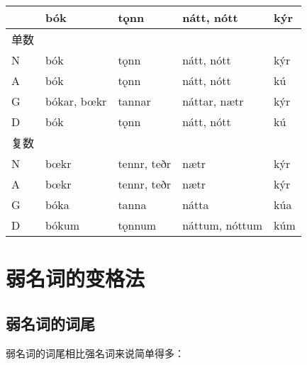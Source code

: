 \begin{longtable}{lllll}
  \toprule
       & \textbf{bók} & \textbf{tǫnn} & \textbf{nátt, nótt} & \textbf{kýr} \\
  \midrule
  \endhead
  \bottomrule
  \endfoot
  单数 &              &               &                     &              \\
  N    & bók          & tǫnn          & nátt, nótt          & kýr          \\
  A    & bók          & tǫnn          & nátt, nótt          & kú           \\
  G    & bókar, bœkr  & tannar        & náttar, nætr        & kýr          \\
  D    & bók          & tǫnn          & nátt, nótt          & kú           \\
  复数 &              &               &                     &              \\
  N    & bœkr         & tennr, teðr   & nætr                & kýr          \\
  A    & bœkr         & tennr, teðr   & nætr                & kýr          \\
  G    & bóka         & tanna         & nátta               & kúa          \\
  D    & bókum        & tǫnnum        & náttum, nóttum      & kúm          \\
\end{longtable}

\section{弱名词的变格法}
\label{弱名词的变格法}

\subsection{弱名词的词尾}
\label{弱名词的词尾}

弱名词的词尾相比强名词来说简单得多：


